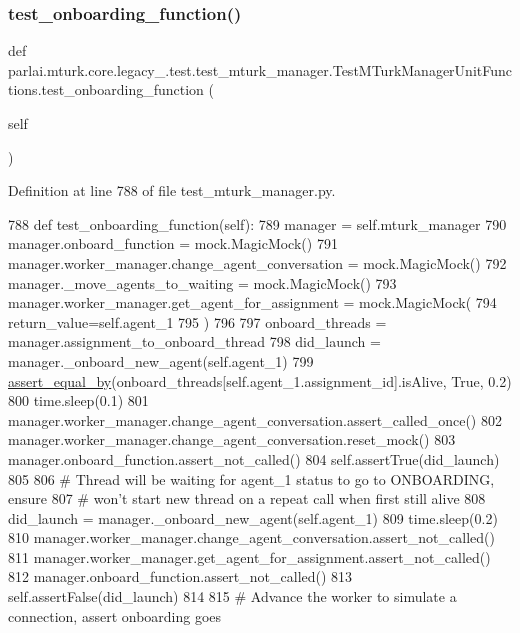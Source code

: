 \subsubsection{\texorpdfstring{test\+\_\+onboarding\+\_\+function()}{test\_onboarding\_function()}}
{\footnotesize\ttfamily def parlai.\+mturk.\+core.\+legacy\+\_.\+test.\+test\+\_\+mturk\+\_\+manager.\+Test\+M\+Turk\+Manager\+Unit\+Functions.\+test\+\_\+onboarding\+\_\+function (\begin{DoxyParamCaption}\item[{}]{self }\end{DoxyParamCaption})}



Definition at line 788 of file test\+\_\+mturk\+\_\+manager.\+py.


\begin{DoxyCode}
788     \textcolor{keyword}{def }test\_onboarding\_function(self):
789         manager = self.mturk\_manager
790         manager.onboard\_function = mock.MagicMock()
791         manager.worker\_manager.change\_agent\_conversation = mock.MagicMock()
792         manager.\_move\_agents\_to\_waiting = mock.MagicMock()
793         manager.worker\_manager.get\_agent\_for\_assignment = mock.MagicMock(
794             return\_value=self.agent\_1
795         )
796 
797         onboard\_threads = manager.assignment\_to\_onboard\_thread
798         did\_launch = manager.\_onboard\_new\_agent(self.agent\_1)
799         \hyperlink{namespaceparlai_1_1mturk_1_1core_1_1test_1_1test__mturk__manager_a1fd7ac4fedefa65d2416601107dbe44c}{assert\_equal\_by}(onboard\_threads[self.agent\_1.assignment\_id].isAlive, \textcolor{keyword}{True}, 0.2)
800         time.sleep(0.1)
801         manager.worker\_manager.change\_agent\_conversation.assert\_called\_once()
802         manager.worker\_manager.change\_agent\_conversation.reset\_mock()
803         manager.onboard\_function.assert\_not\_called()
804         self.assertTrue(did\_launch)
805 
806         \textcolor{comment}{# Thread will be waiting for agent\_1 status to go to ONBOARDING, ensure}
807         \textcolor{comment}{# won't start new thread on a repeat call when first still alive}
808         did\_launch = manager.\_onboard\_new\_agent(self.agent\_1)
809         time.sleep(0.2)
810         manager.worker\_manager.change\_agent\_conversation.assert\_not\_called()
811         manager.worker\_manager.get\_agent\_for\_assignment.assert\_not\_called()
812         manager.onboard\_function.assert\_not\_called()
813         self.assertFalse(did\_launch)
814 
815         \textcolor{comment}{# Advance the worker to simulate a connection, assert onboarding goes}

\end{DoxyCode}
